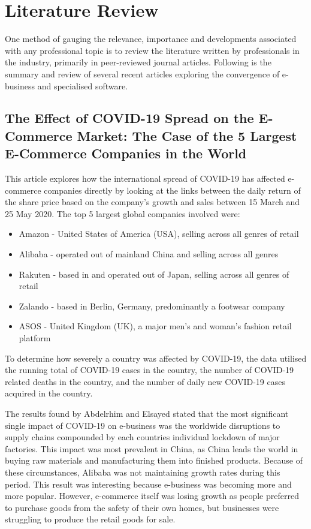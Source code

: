 \documentclass[12pt]{article}
\begin{document}

\section{Literature Review}
One method of gauging the relevance, importance and developments associated with any professional topic is to review the literature written by professionals in the industry, primarily in peer-reviewed journal articles. Following is the summary and review of several recent articles exploring the convergence of e-business and specialised software. \par

\subsection{The Effect of COVID-19 Spread on the E-Commerce Market: The Case of the 5 Largest E-Commerce Companies in the World \cite{abderlin}}
This article explores how the international spread of COVID-19 has affected e-commerce companies directly by looking at the links between the daily return of the share price based on the company’s growth and sales between 15 March and 25 May 2020. The top 5 largest global companies involved were:
\begin{itemize}
\item Amazon - United States of America (USA), selling across all genres of retail
\item Alibaba - operated out of mainland China and selling across all genres
\item Rakuten - based in and operated out of Japan, selling across all genres of retail
\item Zalando - based in Berlin, Germany, predominantly a footwear company
\item ASOS - United Kingdom (UK), a major men’s and woman’s fashion retail platform \par
\end{itemize}

To determine how severely a country was affected by COVID-19, the data utilised the running total of COVID-19 cases in the country, the number of COVID-19 related deaths in the country, and the number of daily new COVID-19 cases acquired in the country. \par

The results found by Abdelrhim and Elsayed stated that the most significant single impact of COVID-19 on e-business was the worldwide disruptions to supply chains compounded by each countries individual lockdown of major factories. This impact was most prevalent in China, as China leads the world in buying raw materials and manufacturing them into finished products. Because of these circumstances, Alibaba was not maintaining growth rates during this period. This result was interesting because e-business was becoming more and more popular. However, e-commerce itself was losing growth as people preferred to purchase goods from the safety of their own homes, but businesses were struggling to produce the retail goods for sale. \par
\end{document}
